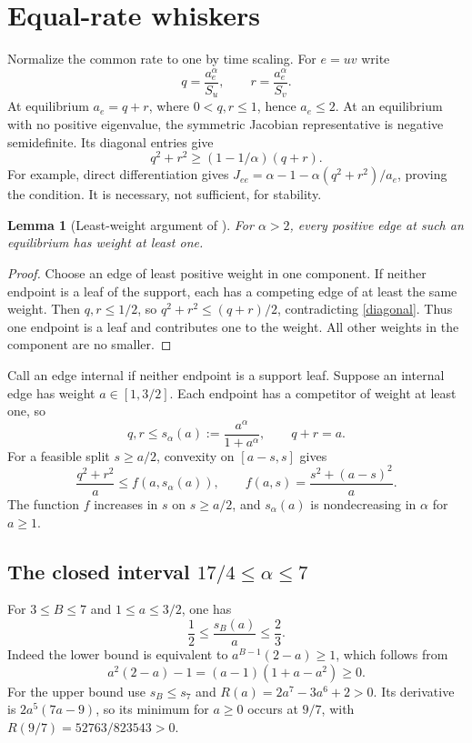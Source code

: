 \documentclass[11pt]{article}
\newtheorem{lemma}[theorem]{Lemma}
\begin{document}
\section{Equal-rate whiskers}
Normalize the common rate to one by time scaling. For $e=uv$ write
\[
 q=\frac{a_e^\alpha}{S_u},\qquad r=\frac{a_e^\alpha}{S_v}.
\]
At equilibrium $a_e=q+r$, where $0<q,r\le1$, hence $a_e\le2$.
At an equilibrium with no positive eigenvalue, the symmetric Jacobian
representative is negative semidefinite. Its diagonal entries give
\begin{equation}\label{diagonal}
 q^2+r^2\ge(1-1/\alpha)(q+r).
\end{equation}
For example, direct differentiation gives
$J_{ee}=\alpha-1-\alpha(q^2+r^2)/a_e$, proving the condition.
It is necessary, not sufficient, for stability.

\begin{lemma}[Least-weight argument of \cite{HK}]\label{least}
For $\alpha>2$, every positive edge at such an equilibrium has weight
at least one.
\end{lemma}
\begin{proof}
Choose an edge of least positive weight in one component. If neither
endpoint is a leaf of the support, each has a competing edge of at least
the same weight. Then $q,r\le1/2$, so
$q^2+r^2\le(q+r)/2$, contradicting \eqref{diagonal}.
Thus one endpoint is a leaf and contributes one to the weight.
All other weights in the component are no smaller.
\end{proof}

Call an edge internal if neither endpoint is a support leaf. Suppose
an internal edge has weight $a\in[1,3/2]$. Each endpoint has a
competitor of weight at least one, so
\begin{equation}\label{cap}
 q,r\le s_\alpha(a):=\frac{a^\alpha}{1+a^\alpha},\qquad q+r=a.
\end{equation}
For a feasible split $s\ge a/2$, convexity on $[a-s,s]$ gives
\begin{equation}\label{f}
 \frac{q^2+r^2}a\le f(a,s_\alpha(a)),\qquad
 f(a,s)=\frac{s^2+(a-s)^2}a.
\end{equation}
The function $f$ increases in $s$ on $s\ge a/2$, and $s_\alpha(a)$
is nondecreasing in $\alpha$ for $a\ge1$.

\subsection{The closed interval $17/4\le\alpha\le7$}
For $3\le B\le7$ and $1\le a\le3/2$, one has
\begin{equation}\label{z}
 \frac12\le\frac{s_B(a)}a\le\frac23.
\end{equation}
Indeed the lower bound is equivalent to $a^{B-1}(2-a)\ge1$, which
follows from
\[
 a^2(2-a)-1=(a-1)(1+a-a^2)\ge0.
\]
For the upper bound use $s_B\le s_7$ and
$R(a)=2a^7-3a^6+2>0$. Its derivative is $2a^5(7a-9)$,
so its minimum for $a\ge0$ occurs at $9/7$, with
$R(9/7)=52763/823543>0$.
\end{document}
